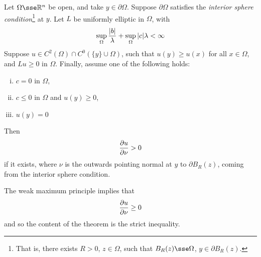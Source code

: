 \documentclass{article}
\begin{document}
\begin{theorem}
     Let \(\Omega \sse \R^n\) be open, and take \(y \in \partial\Omega\). Suppose \(\partial\Omega\) satisfies the \emph{interior sphere condition}\footnote{That is, there exists \(R > 0\), \(z \in \Omega\), such that \(B_R(z) \sse \Omega\), \(y \in \partial B_R(z)\).} at \(y\). Let \(L\) be uniformly elliptic in \(\Omega\), with
    \[\sup_{\Omega}\frac{\abs{b}}{\lambda} + \sup_\Omega \abs{c}{\lambda} < \infty\]
    Suppose \(u \in C^2(\Omega) \cap C^0(\{y\} \cup \Omega)\), such that \(u(y) \ge u(x)\) for all \(x \in \Omega\), and \(Lu \ge 0\) in \(\Omega\). Finally, assume one of the following holds:
    \begin{enumerate}[(i)]
        \item \(c = 0\) in \(\Omega\),
        \item \(c \le 0\) in \(\Omega\) and \(u(y) \ge 0\),
        \item \(u(y) = 0\)
    \end{enumerate}
    Then
    \[\pdv{u}{\nu}(y) > 0\]
    if it exists, where \(\nu\) is the outwards pointing normal at \(y\) to \(\partial B_R(z)\), coming from the interior sphere condition.
\end{theorem}

\begin{remark}
    The weak maximum principle implies that
    \[\pdv{u}{\nu} \ge 0\]
    and so the content of the theorem is the strict inequality.
\end{remark}
\end{document}
